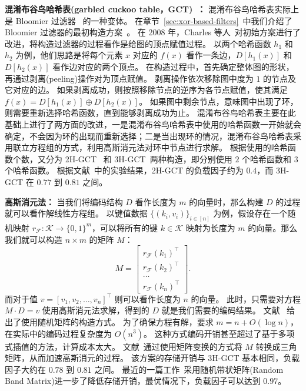 \textbf{混淆布谷鸟哈希表(garbled cuckoo table，GCT)~\cite{pinkas2020psi,garimella2021oblivious}：}
混淆布谷鸟哈希表实际上是 Bloomier 过滤器~\cite{charles2008bloomier} 的一种变体。
在章节~\ref{sec:xor-based-filters}~中我们介绍了 Bloomier 过滤器的最初构造方案~\cite{chazelle2004bloomier}。
在 2008 年，Charles 等人~\cite{charles2008bloomier}对初始方案进行了改进，将构造过滤器的过程看作是给图的顶点赋值过程。
以两个哈希函数 $h_1$ 和 $h_2$ 为例，他们思路是将每个元素 $x$ 对应的 $f(x)$ 看作一条边，$D[h_1(x)]$ 和 $D[h_2(x)]$ 看作边对应的两个顶点。
在构造过程中，首先确定整体图的形状，再通过剥离(peeling)操作对为顶点赋值。
剥离操作依次移除图中度为 $1$ 的节点及它对应的边。
如果剥离成功，则按照移除节点的逆序为各节点赋值，使其满足 $f(x) = D[h_1(x)] \oplus D[h_2(x)]$。
如果图中剩余节点，意味图中出现了环，则需要重新选择哈希函数，直到能够剥离成功为止。
混淆布谷鸟哈希表主要在此基础上进行了两方面的改进，一是混淆布谷鸟哈希表中使用的哈希函数一开始就会确定，不会因为环的出现而重新选择；二是当出现环的情况，混淆布谷鸟哈希表采用联立方程组的方式，利用高斯消元法对环中节点进行求解。
根据使用的哈希函数个数，又分为 2H-GCT~\cite{pinkas2020psi} 和 3H-GCT~\cite{garimella2021oblivious}两种构造，即分别使用 $2$ 个哈希函数和 $3$ 个哈希函数。
根据文献~\cite{bienstock2023NearOptimal}中的实验结果，2H-GCT 的负载因子约为 $0.4$，而 3H-GCT 在 $0.77$ 到 $0.81$ 之间。

\textbf{高斯消元法：}
当我们将编码结构 $D$ 看作长度为 $m$ 的向量时，那么构建 $D$ 的过程就可以看作解线性方程组。
以键值数据 $\{(k_i, v_i)\}_{i\in [n]}$ 为例，假设存在一个随机映射 $r_{\mathcal{F}}:\mathcal{K} \to \{0,1\}^m$，可以将所有的键 $k\in \mathcal{K}$ 映射为长度为 $m$ 的向量。那么我们就可以构造 $n\times m$ 的矩阵 $M$：
\begin{equation}
  M = \left[ \begin{array}{c} r_{\mathcal{F}}(k_1)^\intercal \\ r_{\mathcal{F}}(k_2)^\intercal \\ \dots \\ r_{\mathcal{F}}(k_n)^\intercal  \end{array}  \right].
\end{equation}
而对于值 $v=[v_1, v_2, \dots, v_n]^\intercal$ 则可以看作长度为 $n$ 的向量。
此时，只需要对方程 $M\cdot D = v$ 使用高斯消元法求解，得到的 $D$ 就是我们需要的编码结果。
文献~\cite{garimella2021oblivious} 给出了使用随机矩阵的构造方式。
为了确保方程有解，要求 $m = n + O(\log n)$，在实际中的编码过程复杂度为 $O(n^3)$。
这种方式编码开销甚至超过了基于多项式插值的方法，计算成本太大。
文献~\cite{raghuraman2022blazing}通过使用矩阵变换的方式将 $M$ 转换成三角矩阵，从而加速高斯消元的过程。
该方案的存储开销与 3H-GCT 基本相同，负载因子大约在 $0.78$ 到 $0.81$ 之间。
最近的一篇工作~\cite{bienstock2023NearOptimal}采用随机带状矩阵(Random Band Matrix)进一步了降低存储开销，最优情况下，负载因子可以达到 $0.97$。

